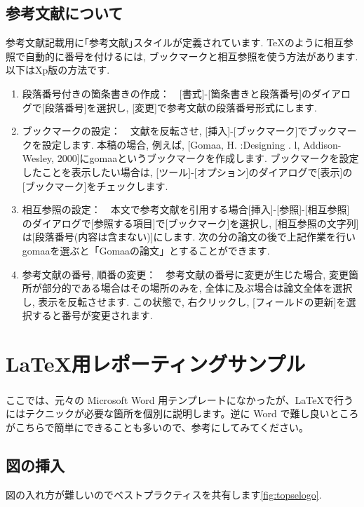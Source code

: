 \documentclass[a4paper,9pt]{extarticle}
\begin{document}
\begin{multicols}{2}
\subsection{参考文献について}
参考文献記載用に｢参考文献｣スタイルが定義されています. TeXのように相互参照で自動的に番号を付けるには, ブックマークと相互参照を使う方法があります. 以下はXp版の方法です. 

\begin{enumerate}
    \item 段落番号付きの箇条書きの作成：　[書式]-[箇条書きと段落番号]のダイアログで[段落番号]を選択し, [変更]で参考文献の段落番号形式にします. 
    \item ブックマークの設定：　文献を反転させ, [挿入]-[ブックマーク]でブックマークを設定します. 本稿の場合, 例えば, [Gomaa,  H. :Designing . l,  Addison-Wesley,  2000]にgomaaというブックマークを作成します. ブックマークを設定したことを表示したい場合は, [ツール]-[オプション]のダイアログで[表示]の[ブックマーク]をチェックします. 
    \item 相互参照の設定：　本文で参考文献を引用する場合[挿入]-[参照]-[相互参照]のダイアログで[参照する項目]で[ブックマーク]を選択し, [相互参照の文字列]は[段落番号(内容は含まない)]にします. 次の分の論文の後で上記作業を行いgomaaを選ぶと「Gomaaの論文\cite{Gomaa}」とすることができます. 
    \item 参考文献の番号, 順番の変更：　参考文献の番号に変更が生じた場合, 変更箇所が部分的である場合はその場所のみを, 全体に及ぶ場合は論文全体を選択し, 表示を反転させます. この状態で, 右クリックし, [フィールドの更新]を選択すると番号が変更されます. 
\end{enumerate}


\section{\LaTeX 用レポーティングサンプル}
ここでは、元々の Microsoft\textsuperscript{\textregistered} Word 用テンプレートになかったが、\LaTeX で行うにはテクニックが必要な箇所を個別に説明します。逆に Word で難し良いところがこちらで簡単にできることも多いので、参考にしてみてください\cite{takahashi}。


\subsection{図の挿入}
図の入れ方が難しいのでベストプラクティスを共有します\autoref{fig:topselogo}. 


\end{multicols}
\end{document}

